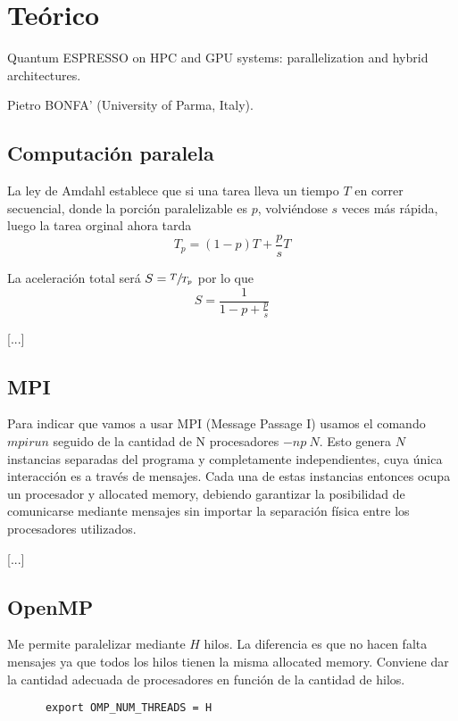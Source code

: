 \section{Teórico}

   Quantum ESPRESSO on HPC and GPU systems: parallelization and hybrid architectures.

   Pietro BONFA' (University of Parma, Italy).

\subsection{Computación paralela}

  La ley de Amdahl establece que si una tarea lleva un tiempo $T$ en correr secuencial, donde la porción paralelizable es $p$, volviéndose $s$ veces más rápida, luego la tarea orginal ahora tarda
    $$T_p = (1-p) T + \frac{p}{s} T$$

  La aceleración total será $S = \sfrac{T}{T_p}$ por lo que
    $$S = \frac{1}{1-p + \frac{p}{s}}$$

  [...]

\subsection{MPI}

  Para indicar que vamos a usar MPI (Message Passage I) usamos el comando $mpirun$ seguido de la cantidad de N procesadores $-np\ N$. Esto genera $N$ instancias separadas del programa y completamente independientes, cuya única interacción es a través de mensajes. Cada una de estas instancias entonces ocupa un procesador y allocated memory, debiendo garantizar la posibilidad de comunicarse mediante mensajes sin importar la separación física entre los procesadores utilizados.

  [...]


\subsection{OpenMP}

  Me permite paralelizar mediante $H$ hilos. La diferencia es que no hacen falta mensajes ya que todos los hilos tienen la misma allocated memory. Conviene dar la cantidad adecuada de procesadores en función de la cantidad de hilos.
    \begin{verbatim}
      export OMP_NUM_THREADS = H
    \end{verbatim}

